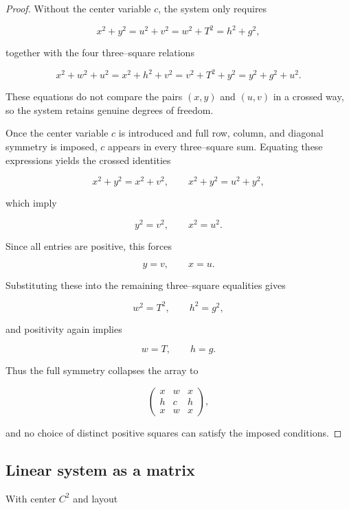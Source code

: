 \documentclass[12pt]{article}
\newtheorem{proof}{Proof}
\begin{document}
\begin{proof}
Without the center variable $c$, the system only requires


\[
x^{2}+y^{2}
= u^{2}+v^{2}
= w^{2}+T^{2}
= h^{2}+g^{2},
\]


together with the four three--square relations


\[
x^{2}+w^{2}+u^{2}
= x^{2}+h^{2}+v^{2}
= v^{2}+T^{2}+y^{2}
= y^{2}+g^{2}+u^{2}.
\]


These equations do not compare the pairs $(x,y)$ and $(u,v)$ in a crossed way, so the system retains genuine degrees of freedom.

Once the center variable $c$ is introduced and full row, column, and diagonal symmetry is imposed, $c$ appears in every three--square sum. Equating these expressions yields the crossed identities


\[
x^{2}+y^{2}=x^{2}+v^{2},
\qquad
x^{2}+y^{2}=u^{2}+y^{2},
\]


which imply


\[
y^{2}=v^{2},
\qquad
x^{2}=u^{2}.
\]


Since all entries are positive, this forces


\[
y=v,
\qquad
x=u.
\]



Substituting these into the remaining three--square equalities gives


\[
w^{2}=T^{2},
\qquad
h^{2}=g^{2},
\]


and positivity again implies


\[
w=T,
\qquad
h=g.
\]



Thus the full symmetry collapses the array to


\[
\begin{pmatrix}
x & w & x\\[4pt]
h & c & h\\[4pt]
x & w & x
\end{pmatrix},
\]


and no choice of distinct positive squares can satisfy the imposed conditions.
\end{proof}


\subsection*{Linear system as a matrix}

With center $C^{2}$ and layout
\end{document}
